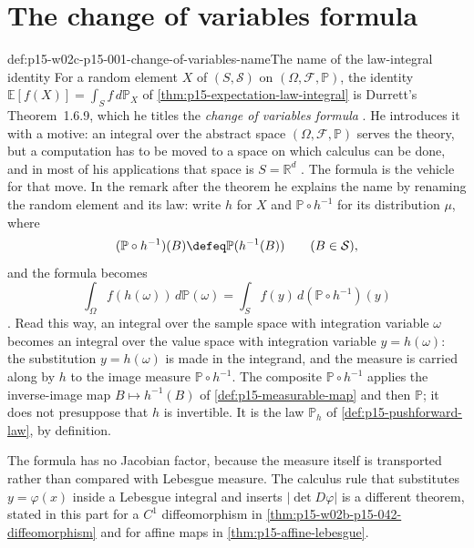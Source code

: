 \section{The change of variables formula}
\label{sec:p15-w02c-p15-001-change-of-variables}

\begin{hbconvention}{def:p15-w02c-p15-001-change-of-variables-name}{The name of the law-integral identity}
For a random element \(X\) of \((S,\mathcal S)\) on
\((\Omega,\mathcal F,\mathbb P)\), the identity
\(\mathbb E[f(X)]=\int_S f\,d\mathbb P_X\) of
\cref{thm:p15-expectation-law-integral} is Durrett's Theorem~1.6.9, which he
titles the \emph{change of variables formula}
\cite[thm.~1.6.9, p.~32]{DurrettPTEAuthor2019}. He introduces it with a
motive: an integral over the abstract space \((\Omega,\mathcal F,\mathbb P)\)
serves the theory, but a computation has to be moved to a space on which
calculus can be done, and in most of his applications that space is
\(S=\mathbb R^d\) \cite[sec.~1.6.3, p.~32]{DurrettPTEAuthor2019}. The
formula is the vehicle for that move. In the remark after the
theorem he explains the name by renaming the random element and its law:
write \(h\) for \(X\) and \(\mathbb P\circ h^{-1}\) for its distribution
\(\mu\), where
\[
 (\mathbb P\circ h^{-1})(B)\defeq\mathbb P(h^{-1}(B))\qquad(B\in\mathcal S),
\]
and the formula becomes
\[
 \int_\Omega f(h(\omega))\,d\mathbb P(\omega)
 =\int_S f(y)\,d(\mathbb P\circ h^{-1})(y)
\]
\cite[thm.~1.6.9 and remark, p.~32]{DurrettPTEAuthor2019}.
Read this way, an integral over the sample space with integration variable
\(\omega\) becomes an integral over the value space with integration
variable \(y=h(\omega)\): the substitution \(y=h(\omega)\) is made in
the integrand, and the measure is carried along by \(h\) to the image
measure \(\mathbb P\circ h^{-1}\). The composite \(\mathbb P\circ h^{-1}\)
applies the inverse-image map \(B\mapsto h^{-1}(B)\) of
\cref{def:p15-measurable-map} and then \(\mathbb P\); it does not presuppose
that \(h\) is invertible. It is the law \(\mathbb P_h\) of
\cref{def:p15-pushforward-law}, by definition.

The formula has no Jacobian factor, because the measure itself is
transported rather than compared with Lebesgue measure. The calculus rule
that substitutes \(y=\varphi(x)\) inside a Lebesgue integral and inserts
\(|\det D\varphi|\) is a different theorem, stated in this part for a
\(C^1\) diffeomorphism in \cref{thm:p15-w02b-p15-042-diffeomorphism} and
for affine maps in \cref{thm:p15-affine-lebesgue}.
\end{hbconvention}

